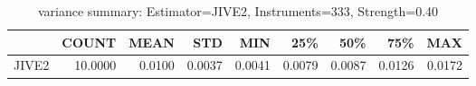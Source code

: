 \begin{table}[ht]
\centering
\caption{variance summary: Estimator=JIVE2, Instruments=333, Strength=0.40}
\begin{tabular}{lrrrrrrrr}
\toprule
 & COUNT & MEAN & STD & MIN & 25\% & 50\% & 75\% & MAX \\
\midrule
JIVE2 & 10.0000 & 0.0100 & 0.0037 & 0.0041 & 0.0079 & 0.0087 & 0.0126 & 0.0172 \\
\bottomrule
\end{tabular}
\end{table}

